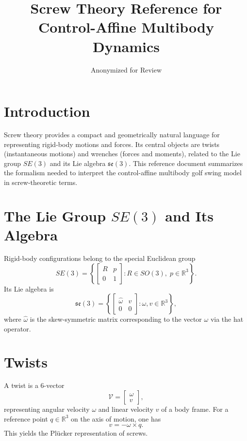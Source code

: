 \documentclass[12pt]{article}
\title{Screw Theory Reference for Control-Affine Multibody Dynamics}
\author{Anonymized for Review}
\date{}
\begin{document}
\maketitle

\section{Introduction}

Screw theory provides a compact and geometrically natural language for representing rigid-body motions and forces. Its central objects are twists (instantaneous motions) and wrenches (forces and moments), related to the Lie group $SE(3)$ and its Lie algebra $\mathfrak{se}(3)$. This reference document summarizes the formalism needed to interpret the control-affine multibody golf swing model in screw-theoretic terms.

\section{The Lie Group $SE(3)$ and Its Algebra}

Rigid-body configurations belong to the special Euclidean group
\begin{equation}
SE(3)
=
\left\{
\begin{bmatrix}
R & p \\
0 & 1
\end{bmatrix}
:
R\in SO(3), \;
p\in \mathbb{R}^3
\right\}.
\end{equation}
Its Lie algebra is
\begin{equation}
\mathfrak{se}(3)
=
\left\{
\begin{bmatrix}
\hat{\omega} & v \\
0 & 0
\end{bmatrix}
:
\omega, v \in \mathbb{R}^3
\right\},
\end{equation}
where $\hat{\omega}$ is the skew-symmetric matrix corresponding to the vector $\omega$ via the hat operator.

\section{Twists}

A twist is a 6-vector
\begin{equation}
\mathcal{V} =
\begin{bmatrix}
\omega \\ v
\end{bmatrix},
\end{equation}
representing angular velocity $\omega$ and linear velocity $v$ of a body frame. For a reference point $q \in \mathbb{R}^3$ on the axis of motion, one has
\begin{equation}
v = -\omega \times q.
\end{equation}
This yields the Pl\"ucker representation of screws.
\end{document}
